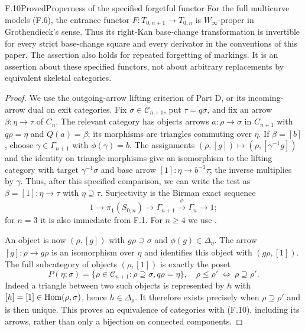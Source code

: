 \begin{statement}{F.10}{Proved}{Properness of the specified forgetful
functor}
For the full multicurve models (F.6), the entrance functor
$F:T_{0,n+1}\to T_{0,n}$ is $W_\infty$-proper in Grothendieck's sense.
Thus its right-Kan base-change transformation is invertible for every
strict base-change square and every derivator in the conventions of
this paper.  The assertion also holds for repeated forgetting of
markings.  It is an assertion about these specified functors, not about
arbitrary replacements by equivalent skeletal categories.
\end{statement}
\begin{proof}
We use the outgoing-arrow lifting criterion of Part D, or its
incoming-arrow dual on exit categories.  Fix $\sigma\in\mathcal C_{n+1}$,
put $\tau=q\sigma$, and fix an arrow $\beta:\eta\to\tau$ of $C_n$.
The relevant category has objects arrows
$a:\rho\to\sigma$ in $C_{n+1}$ with $q\rho=\eta$ and
$Q(a)=\beta$; its morphisms are triangles commuting over $\eta$.
If $\beta=[b]$, choose $\gamma\in\Gamma_{n+1}$ with
$\phi(\gamma)=b$.  The assignments
$(\rho,[g])\mapsto(\rho,[\gamma^{-1}g])$ and the identity on
triangle morphisms give an isomorphism to the lifting category with
target $\gamma^{-1}\sigma$ and base arrow
$[1]:\eta\to b^{-1}\tau$; the inverse multiplies by $\gamma$.
Thus, after this specified comparison, we can write the test as
$\beta=[1]:\eta\to\tau$ with $\eta\supseteq\tau$.
Surjectivity is the Birman exact sequence
\[
 1\longrightarrow\pi_1(S_{0,n})\longrightarrow\Gamma_{n+1}
 \xrightarrow{\phi}\Gamma_n\longrightarrow1;                 \tag{F.9}
\]
for $n=3$ it is also immediate from F.1.  For $n\geq4$ we use
\citet[\S2.1]{FKentLeiningerSchleimer2009}.

An object is now $(\rho,[g])$ with
$g\rho\supseteq\sigma$ and $\phi(g)\in\Delta_\eta$.
The arrow $[g]:\rho\to g\rho$ is an isomorphism over $\eta$ and
identifies this object with $(g\rho,[1])$.  The full subcategory of
objects $(\rho,[1])$ is exactly the poset
\[
 P(\eta;\sigma)=
 \{\rho\in\mathcal C_{n+1}:\rho\supseteq\sigma, q\rho=\eta\},
 \quad \rho\leq\rho'\ \Longleftrightarrow\ \rho\supseteq\rho'. \tag{F.10}
\]
Indeed a triangle between two such objects is represented by $h$ with
$[h]=[1]\in\operatorname{Hom}(\rho,\sigma)$, hence $h\in\Delta_\rho$.
It therefore exists precisely when $\rho\supseteq\rho'$ and is then
unique.  This proves an equivalence of categories with (F.10), including
its arrows, rather than only a bijection on connected components.


\end{proof}
